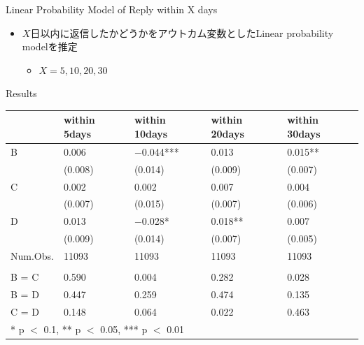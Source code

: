 \documentclass[
      aspectratio=169,
        12pt,
    ]{beamer}
\providecommand{\tightlist}{%
  \setlength{\itemsep}{0pt}\setlength{\parskip}{0pt}}
\begin{document}
\begin{frame}{Linear Probability Model of Reply within X days}
\protect\hypertarget{linear-probability-model-of-reply-within-x-days}{}
\begin{itemize}
\tightlist
\item
  \(X\)日以内に返信したかどうかをアウトカム変数としたLinear probability modelを推定

  \begin{itemize}
  \tightlist
  \item
    \(X = 5, 10, 20, 30\)
  \end{itemize}
\end{itemize}
\end{frame}

\begin{frame}{Results}
\protect\hypertarget{results}{}
\begin{table}
\centering
\fontsize{9}{11}\selectfont
\begin{tabular}[t]{l>{\centering\arraybackslash}p{6em}>{\centering\arraybackslash}p{6em}>{\centering\arraybackslash}p{6em}>{\centering\arraybackslash}p{6em}}
\toprule
  & within 5days & within 10days & within 20days & within 30days\\
\midrule
B & \num{0.006} & \num{-0.044}*** & \num{0.013} & \num{0.015}**\\
 & (\num{0.008}) & (\num{0.014}) & (\num{0.009}) & (\num{0.007})\\
C & \num{0.002} & \num{0.002} & \num{0.007} & \num{0.004}\\
 & (\num{0.007}) & (\num{0.015}) & (\num{0.007}) & (\num{0.006})\\
D & \num{0.013} & \num{-0.028}* & \num{0.018}** & \num{0.007}\\
 & (\num{0.009}) & (\num{0.014}) & (\num{0.007}) & (\num{0.005})\\
\midrule
Num.Obs. & \num{11093} & \num{11093} & \num{11093} & \num{11093}\\
\addlinespace[0.3em]
\multicolumn{5}{l}{\textit{F-tests, p-value}}\\
\hspace{1em}B = C & \num{0.590} & \num{0.004} & \num{0.282} & \num{0.028}\\
\hspace{1em}B = D & \num{0.447} & \num{0.259} & \num{0.474} & \num{0.135}\\
\hspace{1em}C = D & \num{0.148} & \num{0.064} & \num{0.022} & \num{0.463}\\
\bottomrule
\multicolumn{5}{l}{\rule{0pt}{1em}* p $<$ 0.1, ** p $<$ 0.05, *** p $<$ 0.01}\\
\end{tabular}
\end{table}
\end{frame}
\end{document}
